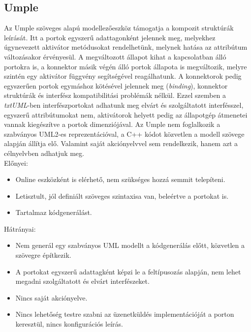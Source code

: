 \documentclass[a4paper,12pt]{report}
\begin{document}
\subsection{Umple}
Az Umple \cite{umple} szöveges alapú modellezőeszköz támogatja a kompozit struktúrák leírását. Itt a portok egyszerű adattagonként jelennek meg, melyekhez úgynevezett aktivátor metódusokat rendelhetünk, melynek hatása az attribútum változásakor érvényesül. A megváltozott állapot kihat a kapcsolatban álló portokra is, a konnektor másik végén álló portok állapota is megváltozik, melyre szintén egy aktivátor függvény segítségével reagálhatunk. A konnektorok pedig egyszerűen portok egymáshoz kötésével jelennek meg (\textit{binding}), konnektor struktúrák és interfész kompatibilitási problémák nélkül. Ezzel szemben a \textit{txtUML}-ben interfészportokat adhatunk meg elvárt és szolgáltatott interfésszel, egyszerű attribútumokat nem, aktivátorok helyett pedig az állapotgép átmenetei vannak kiegészítve a portok dimenziójával. Az Umple nem foglalkozik a szabványos UML2-es reprezentációval, a C++ kódot közvetlen a modell szövege alapján állítja elő. Valamint saját akciónyelvvel sem rendelkezik, hanem azt a célnyelvben adhatjuk meg. \\

Előnyei:
\begin{itemize}
\item Online eszközként is elérhető, nem szükséges hozzá semmit telepíteni.
\item Letisztult, jól definiált szöveges szintaxisa van, beleértve a portokat is.
\item Tartalmaz kódgenerálást.
\end{itemize}
Hátrányai:
\begin{itemize}
\item Nem generál egy szabványos UML modellt a kódgenerálás előtt, közvetlen a szövegre építkezik.
\item A portokat egyszerű adattagként képzi le a feltípusozás alapján, nem lehet megadni szolgáltatott és elvárt interfészeket.
\item Nincs saját akciónyelve.
\item Nincs lehetőség testre szabni az üzenetküldés implementációját a porton keresztül, nincs konfigurációs leírás.
\end{itemize}
\end{document}
